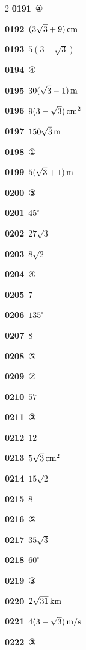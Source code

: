 \documentclass[10pt,a4paper]{article}
\begin{document}
\begin{multicols}{2}
\noindent\textbf{0191}\ ④\par
\noindent\textbf{0192}\ $(3\sqrt{3}+9)\mkern3mu \mathrm{cm}$\par
\noindent\textbf{0193}\ $5(3-\sqrt{3})$\par
\noindent\textbf{0194}\ ④\par
\noindent\textbf{0195}\ $30(\sqrt{3}-1)\mkern3mu \mathrm{m}$\par
\noindent\textbf{0196}\ $9(3-\sqrt{3})\mkern3mu \mathrm{cm}^2$\par
\noindent\textbf{0197}\ $150\sqrt{3}\mkern3mu \mathrm{m}$\par
\noindent\textbf{0198}\ ①\par
\noindent\textbf{0199}\ $5(\sqrt{3}+1)\mkern3mu \mathrm{m}$\par
\noindent\textbf{0200}\ ③\par
\noindent\textbf{0201}\ $45^\circ$\par
\noindent\textbf{0202}\ $27\sqrt{3}$\par
\noindent\textbf{0203}\ $8\sqrt{2}$\par
\noindent\textbf{0204}\ ④\par
\noindent\textbf{0205}\ $7$\par
\noindent\textbf{0206}\ $135^\circ$\par
\noindent\textbf{0207}\ $8$\par
\noindent\textbf{0208}\ ⑤\par
\noindent\textbf{0209}\ ②\par
\noindent\textbf{0210}\ $57$\par
\noindent\textbf{0211}\ ③\par
\noindent\textbf{0212}\ $12$\par
\noindent\textbf{0213}\ $5\sqrt{3}\mkern3mu \mathrm{cm}^2$\par
\noindent\textbf{0214}\ $15\sqrt{2}$\par
\noindent\textbf{0215}\ $8$\par
\noindent\textbf{0216}\ ⑤\par
\noindent\textbf{0217}\ $35\sqrt{3}$\par
\noindent\textbf{0218}\ $60^\circ$\par
\noindent\textbf{0219}\ ③\par
\noindent\textbf{0220}\ $2\sqrt{31}\mkern3mu \mathrm{km}$\par
\noindent\textbf{0221}\ $4(3-\sqrt{3})\mkern3mu \mathrm{m/s}$\par
\noindent\textbf{0222}\ ③\par

\end{multicols}
\end{document}
